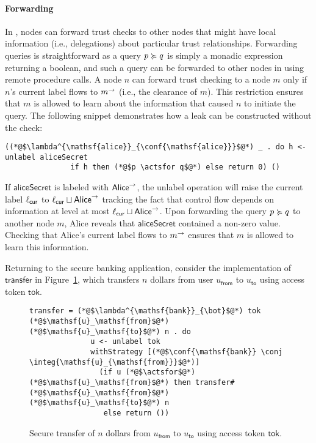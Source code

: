 \paragraph{Forwarding}
In \lang{}, nodes can forward trust checks to other nodes that might have local information (i.e., delegations) about particular trust relationships. Forwarding queries is straightforward as a query $p \succcurlyeq q$ is simply a monadic expression returning a boolean, and such a query can be forwarded to other nodes in \lang{} using remote procedure calls.
A node $n$ can forward trust checking to a node $m$ only if $n$'s current label flows to $m^{\rightarrow}$ (i.e., the clearance of $m$). This restriction ensures that $m$ is allowed to learn about the information that caused $n$ to initiate the query.  The following snippet demonstrates how a leak can be constructed without the check:
\begin{lstlisting}
((*@$\lambda^{\mathsf{alice}}_{\conf{\mathsf{alice}}}$@*) _ . do h <- unlabel aliceSecret
               if h then (*@$p \actsfor q$@*) else return 0) ()
\end{lstlisting}
If $\mathsf{aliceSecret}$ is labeled with $\mathsf{Alice}^{\rightarrow}$, the unlabel operation will raise the current label $\ell_{\mathsf{cur}}$ to $\ell_{\mathsf{cur}} \sqcup \mathsf{Alice}^{\rightarrow}$ tracking the fact that control flow depends on information at level at most $\ell_{\mathsf{cur}} \sqcup \mathsf{Alice}^{\rightarrow}$. Upon forwarding the query $p \succcurlyeq q$ to another node $m$, Alice reveals that $\mathsf{aliceSecret}$ contained a non-zero value. Checking that Alice's current label flows to $m^{\rightarrow}$ ensures that $m$ is allowed to learn this information.

Returning to the secure banking application, consider the implementation of $\mathsf{transfer}$ in Figure~\ref{fig:sec-transfer}, which transfers $n$ dollars from user $u_\mathsf{from}$ to $u_\mathsf{to}$ using access token $\mathsf{tok}$.

\begin{figure}
\centering
\begin{lstlisting}
transfer = (*@$\lambda^{\mathsf{bank}}_{\bot}$@*) tok (*@$\mathsf{u}_\mathsf{from}$@*) (*@$\mathsf{u}_\mathsf{to}$@*) n . do
              u <- unlabel tok
              withStrategy [(*@$\conf{\mathsf{bank}} \conj \integ{\mathsf{u}_{\mathsf{from}}}$@*)]
                (if u (*@$\actsfor$@*) (*@$\mathsf{u}_\mathsf{from}$@*) then transfer# (*@$\mathsf{u}_\mathsf{from}$@*) (*@$\mathsf{u}_\mathsf{to}$@*) n
                 else return ())
\end{lstlisting}
\caption{Secure transfer of $n$ dollars from $u_{\mathsf{from}}$ to $u_{\mathsf{to}}$ using access token $\mathsf{tok}$.}
\label{fig:sec-transfer}
\end{figure}

